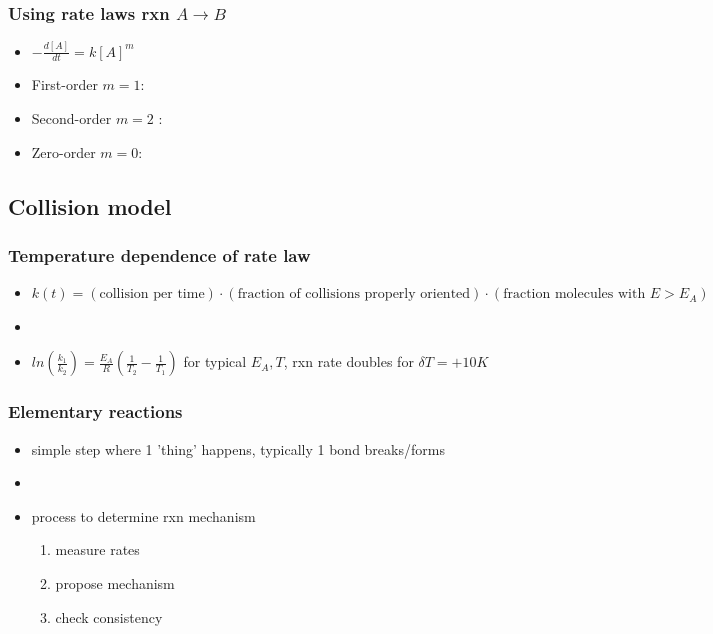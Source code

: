 \documentclass[ wastespaceontitle, english]{cheat_sheet_template}
\begin{document}
    \subsubsection{Using rate laws rxn $A \to B$}
    \begin{itemize}
        \item$ - \frac{d[A]}{dt} = k [A]^m$
        \item First-order $m = 1$:   
        \item Second-order $m=2$ :   
        \item Zero-order $m=0$:     
    \end{itemize}
    \subsection{Collision model}
    \subsubsection{Temperature dependence of rate law}
    \begin{itemize}
        \item $k(t) = (\text{collision per time}) \cdot (\text{fraction of collisions properly oriented}) \cdot  (\text{fraction molecules with } E > E_A) $ %
        \item {} 
        \item $ln(\frac{k_1}{k_2})= \frac{E_A}{R} (\frac{1}{T_2} -\frac{1}{T_1} )$ for typical $E_A, T$, rxn rate doubles for $\delta T = + 10K$ 
    \end{itemize}
    \subsubsection{Elementary reactions}
    \begin{itemize}
        \item simple step where 1 'thing' happens, typically 1 bond breaks/forms
        \item {}
        \item process to determine rxn mechanism \begin{enumerate}
            \item measure rates
            \item propose mechanism
            \item check consistency
        \end{enumerate}
    \end{itemize}
\end{document}
